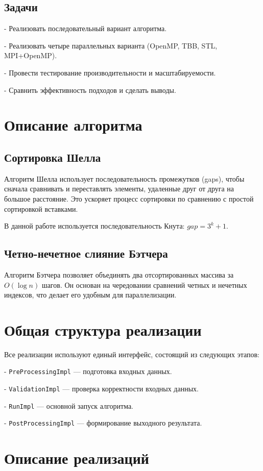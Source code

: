\documentclass[12pt]{article}
\begin{document}
\subsection*{Задачи}

    
- Реализовать последовательный вариант алгоритма.
    
- Реализовать четыре параллельных варианта (OpenMP, TBB, STL, MPI+OpenMP).
    
- Провести тестирование производительности и масштабируемости.
    
- Сравнить эффективность подходов и сделать выводы.


\section{Описание алгоритма}
\subsection*{Сортировка Шелла}
Алгоритм Шелла использует последовательность промежутков (gaps), чтобы сначала сравнивать и переставлять элементы, удаленные друг от друга на большое расстояние. Это ускоряет процесс сортировки по сравнению с простой сортировкой вставками.

В данной работе используется последовательность Кнута: $gap = 3^k + 1$.

\subsection*{Четно-нечетное слияние Бэтчера}
Алгоритм Бэтчера позволяет объединять два отсортированных массива за $O(\log n)$ шагов. Он основан на чередовании сравнений четных и нечетных индексов, что делает его удобным для параллелизации.

\section{Общая структура реализации}
Все реализации используют единый интерфейс, состоящий из следующих этапов:

    
- \texttt{PreProcessingImpl} — подготовка входных данных.
    
- \texttt{ValidationImpl} — проверка корректности входных данных.
    
- \texttt{RunImpl} — основной запуск алгоритма.
    
- \texttt{PostProcessingImpl} — формирование выходного результата.


\section{Описание реализаций}
\end{document}
